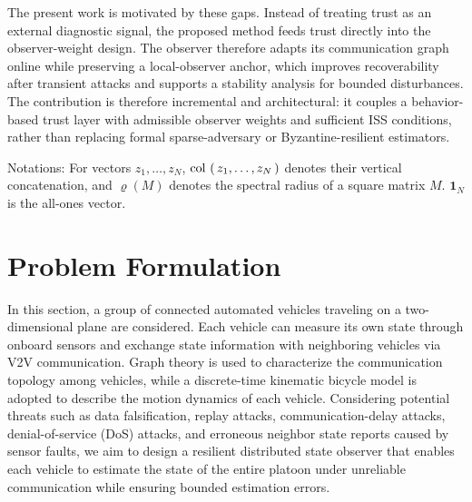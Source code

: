 \documentclass[letterpaper,journal]{IEEEtran}
\def\col#1{\mathop{{\rm col}\,\left(\,#1\,\right)}}
\begin{document}
The present work is motivated by these gaps. Instead of treating trust as an external diagnostic signal, the proposed method feeds trust directly into the observer-weight design. The observer therefore adapts its communication graph online while preserving a local-observer anchor, which improves recoverability after transient attacks and supports a stability analysis for bounded disturbances. The contribution is therefore incremental and architectural: it couples a behavior-based trust layer with admissible observer weights and sufficient ISS conditions, rather than replacing formal sparse-adversary or Byzantine-resilient estimators.

Notations: For vectors $z_1,\ldots,z_N$, $\col{z_1,\ldots,z_N}$ denotes their vertical concatenation, and $\varrho(M)$ denotes the spectral radius of a square matrix $M$. $\mathbf{1}_N$ is the all-ones vector.

\section{Problem Formulation}\label{sec_vehiclemodel}

In this section, a group of connected automated vehicles traveling on a two-dimensional plane are considered. Each vehicle can measure its own state through onboard sensors and exchange state information with neighboring vehicles via V2V communication. Graph theory is used to characterize the communication topology among vehicles, while a discrete-time kinematic bicycle model is adopted to describe the motion dynamics of each vehicle. Considering potential threats such as data falsification, replay attacks, communication-delay attacks, denial-of-service (DoS) attacks, and erroneous neighbor state reports caused by sensor faults, we aim to design a resilient distributed state observer that enables each vehicle to estimate the state of the entire platoon under unreliable communication while ensuring bounded estimation errors.
\end{document}
